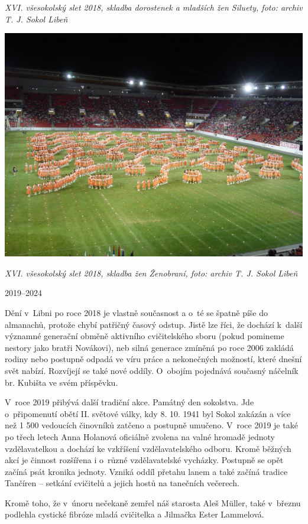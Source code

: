 \documentclass[a5paper, 11pt, twoside]{article}
\begin{document}
\textit{XVI. všesokolský slet 2018, skladba dorostenek a mladších žen
Siluety, foto: archiv T. J. Sokol Libeň}

 \includegraphics[width=\textwidth]{img/65_zenobrani.JPG}

\textit{XVI. všesokolský slet 2018, skladba žen Ženobraní, foto: archiv T.
J. Sokol Libeň}

2019--2024

Dění v~Libni po roce 2018 je vlastně současnost a o~té se špatně píše do
almanachů, protože chybí patřičný časový odstup. Jistě lze říci, že
dochází k~další významné generační obměně aktivního cvičitelského sboru
(pokud pomineme nestory jako bratři Novákovi), neb silná generace
zmíněná po roce 2006 zakládá rodiny nebo postupně odpadá ve víru práce a
nekonečných možností, které dnešní svět nabízí. Rozvíjejí se také nové
oddíly. O~obojím pojednává současný náčelník br. Kubišta ve svém
příspěvku.

V~roce 2019 přibývá další tradiční akce. Památný den sokolstva. Jde
o~připomenutí obětí II. světové války, kdy 8. 10. 1941 byl Sokol zakázán a
více než 1 500 vedoucích činovníků zatčeno a postupně umučeno. V~roce
2019 je také po třech letech Anna Holanová oficiálně zvolena na valné
hromadě jednoty vzdělavatelkou a dochází ke vzkříšení vzdělavatelského
odboru. Kromě běžných akcí je činnost rozšířena i o~různé vzdělavatelské
vycházky. Postupně se opět začíná psát kronika jednoty. Vzniká oddíl
přetahu lanem a také začíná tradice Tančíren -- setkání cvičitelů a
jejich hostů na tanečních večerech.

Kromě toho, že v~únoru nečekaně zemřel náš starosta Aleš Müller, také
v~březnu podlehla cystické fibróze mladá cvičitelka a Jilmačka Ester
Lammelová.
\end{document}

